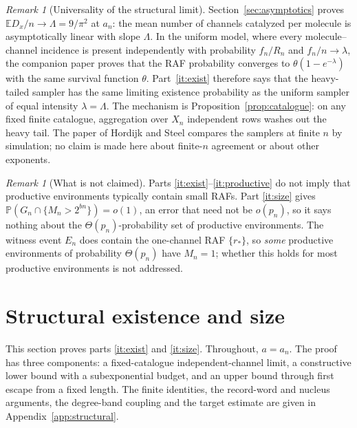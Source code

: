 \documentclass[11pt,letterpaper]{article}
\theoremstyle{plain}
\theoremstyle{definition}
\theoremstyle{remark}
\newtheorem{remark}[theorem]{Remark}
\numberwithin{equation}{section}
\newcommand{\PP}{\mathbb P}
\newcommand{\EE}{\mathbb E}
\begin{document}
\begin{remark}[Universality of the structural limit]\label{rem:universality}
Section~\ref{sec:asymptotics} proves $\EE D_x/n\to\Lambda=9/\pi^2$ at $a_n$: the mean number of channels catalyzed per molecule is asymptotically linear with slope $\Lambda$. In the uniform model, where every molecule--channel incidence is present independently with probability $f_n/R_n$ and $f_n/n\to\lambda$, the companion paper \cite{criticalwindow2026} proves that the RAF probability converges to $\theta(1-e^{-\lambda})$ with the same survival function $\theta$. Part~\ref{it:exist} therefore says that the heavy-tailed sampler has the same limiting existence probability as the uniform sampler of equal intensity $\lambda=\Lambda$. The mechanism is Proposition~\ref{prop:catalogue}: on any fixed finite catalogue, aggregation over $X_n$ independent rows washes out the heavy tail. The paper of Hordijk and Steel \cite{hordijk2016variable} compares the samplers at finite $n$ by simulation; no claim is made here about finite-$n$ agreement or about other exponents.
\end{remark}

\begin{remark}[What is not claimed]\label{rem:notclaimed}
Parts \ref{it:exist}--\ref{it:productive} do not imply that productive environments typically contain small RAFs. Part \ref{it:size} gives $\PP(G_n\cap\{M_n>2^{bn}\})=o(1)$, an error that need not be $o(p_n)$, so it says nothing about the $\Theta(p_n)$-probability set of productive environments. The witness event $E_n$ does contain the one-channel RAF $\{r_*\}$, so \emph{some} productive environments of probability $\Theta(p_n)$ have $M_n=1$; whether this holds for most productive environments is not addressed.
\end{remark}

\section{Structural existence and size}\label{sec:structural}

This section proves parts \ref{it:exist} and \ref{it:size}. Throughout, $a=a_n$. The proof has three components: a fixed-catalogue independent-channel limit, a constructive lower bound with a subexponential budget, and an upper bound through first escape from a fixed length. The finite identities, the record-word and nucleus arguments, the degree-band coupling and the target estimate are given in Appendix~\ref{app:structural}.
\end{document}
